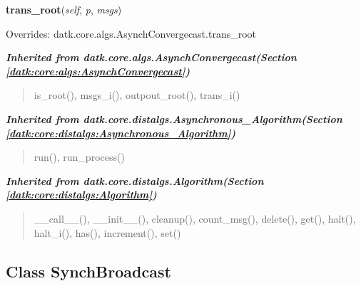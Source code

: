     \vspace{0.5ex}

\hspace{.8\funcindent}\begin{boxedminipage}{\funcwidth}

    \raggedright \textbf{trans\_root}(\textit{self}, \textit{p}, \textit{msgs})

\setlength{\parskip}{2ex}
\setlength{\parskip}{1ex}
      Overrides: datk.core.algs.AsynchConvergecast.trans\_root

    \end{boxedminipage}


\large{\textbf{\textit{Inherited from datk.core.algs.AsynchConvergecast\textit{(Section \ref{datk:core:algs:AsynchConvergecast})}}}}

\begin{quote}
is\_root(), msgs\_i(), outpout\_root(), trans\_i()
\end{quote}

\large{\textbf{\textit{Inherited from datk.core.distalgs.Asynchronous\_Algorithm\textit{(Section \ref{datk:core:distalgs:Asynchronous_Algorithm})}}}}

\begin{quote}
run(), run\_process()
\end{quote}

\large{\textbf{\textit{Inherited from datk.core.distalgs.Algorithm\textit{(Section \ref{datk:core:distalgs:Algorithm})}}}}

\begin{quote}
\_\_call\_\_(), \_\_init\_\_(), cleanup(), count\_msg(), delete(), get(), halt(), halt\_i(), has(), increment(), set()
\end{quote}


\subsection{Class SynchBroadcast}

